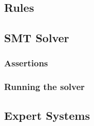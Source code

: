 


\subsection{Rules}\label{sec:rules}


\subsection{SMT Solver}\label{sec:smt_solver}


\subsubsection{Assertions}\label{sec:assertions}


\subsubsection{Running the solver}\label{sec:running_solver}



\subsection{Expert Systems}\label{sec:epert_systems}





